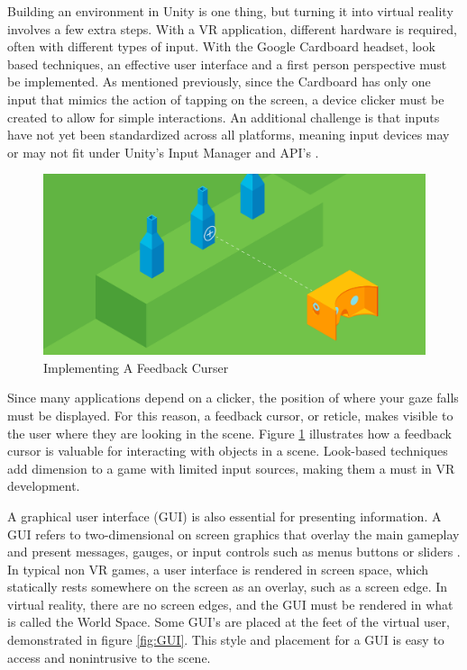\documentclass[12pt]{article}
\begin{document}
Building an environment in Unity is one thing, but turning it into virtual reality involves a few extra steps. With a VR application, different hardware is required, often with different types of input. With the Google Cardboard headset, look based techniques, an effective user interface and a first person perspective must be implemented. As mentioned previously, since the Cardboard has only one input that mimics the action of tapping on the screen, a device clicker must be created to allow for simple interactions. An additional challenge is that inputs have not yet been standardized across all platforms, meaning input devices may or may not fit under Unity's Input Manager and API's \cite{linowes}. 

 \begin{figure}[h]
    \centering
 \includegraphics[width=.6\textwidth]{image13_reticle}
  \caption{Implementing A Feedback Curser \cite{reticle}}
  \label{fig:reticle}
 \end{figure}
 
\par Since many applications depend on a clicker, the position of where your gaze falls must be displayed. For this reason, a feedback cursor, or reticle, makes visible to the user where they are looking in the scene. Figure \ref{fig:reticle} illustrates how a feedback cursor is valuable for interacting with objects in a scene. Look-based techniques add dimension to a game with limited input sources, making them a must in VR development.

\par A graphical user interface (GUI) is also essential for presenting information. A GUI refers to two-dimensional on screen graphics that overlay the main gameplay and present messages, gauges, or input controls such as menus buttons or sliders \cite{linowes}. In typical non VR games, a user interface is rendered in screen space, which statically rests somewhere on the screen as an overlay, such as a screen edge. In virtual reality, there are no screen edges, and the GUI must be rendered in what is called the World Space. Some GUI's are placed at the feet of the virtual user, demonstrated in figure \ref{fig:GUI}. This style and placement for a GUI is easy to access and nonintrusive to the scene.
\end{document}
